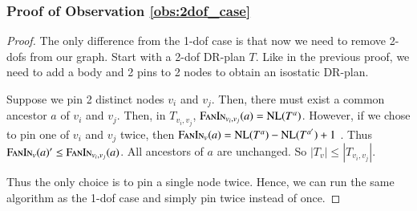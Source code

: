\subsubsection{Proof of Observation \ref{obs:2dof_case}}
\begin{proof}
    The only difference from the 1-dof case is that now we need to remove
    2-dofs from our graph. Start with a 2-dof DR-plan $T$. Like in the previous proof, we need to add a body and 2 pins to 2 nodes to obtain an isostatic DR-plan.

    Suppose we pin 2 distinct nodes $v_i$ and $v_j$. Then, there must exist a common ancestor $a$ of $v_i$ and $v_j$. Then, in $T_{v_i,v_j}$, $\textsc{FanIn}_{v_i,v_j}(a) = \textsc{NL}(T^a)$. However, if we chose to pin one of $v_i$ and $v_j$ twice, then $\textsc{FanIn}_{v}(a) = \textsc{NL}(T^a) - \textsc{NL}(T^{a'}) +1$ . Thus $\textsc{FanIn}_{v}(a)' \leq \textsc{FanIn}_{v_i,v_j}(a)$. All ancestors of $a$ are unchanged. So $|T_v| \leq |T_{v_i,v_j}|$.

    Thus the only choice is to pin a single node twice. Hence, we can run the same algorithm as the 1-dof case and simply pin twice instead of once.
\end{proof}

